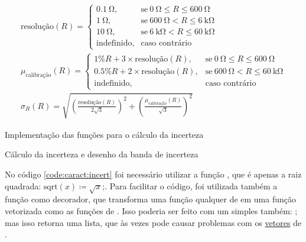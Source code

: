     \begin{gather}
        \label{eq:resolucao}
        \text{resolução}(R) = \begin{cases}
            \SI{0.1}{\ohm}, & \text{se}~ \SI{0}{\ohm} \le R \le \SI{600}{\ohm} \\
            \SI{1}{\ohm},   & \text{se}~ \SI{600}{\ohm} < R \le \SI{6}{\kilo\ohm} \\
            \SI{10}{\ohm},  & \text{se}~ \SI{6}{\kilo\ohm} < R \le \SI{60}{\kilo\ohm} \\
            \text{indefinido}, & \text{caso contrário}
        \end{cases} \\%
        \label{eq:calibracao}
        \mu_\text{calibração}(R) = \begin{cases}
            1\% R + 3 \times \text{resolução}(R),   & \text{se}~ \SI{0}{\ohm} \le R \le \SI{600}{\ohm} \\
            0.5\% R + 2 \times \text{resolução}(R), & \text{se}~ \SI{600}{\ohm} < R \le \SI{60}{\kilo\ohm} \\
            \text{indefinido}, & \text{caso contrário}
        \end{cases} \\%
        \label{eq:incerteza}
        \sigma_R(R) = \sqrt{\left(\frac{\text{resolução}(R)}{2 \sqrt{3}} \right)^2 + \left(\frac{\mu_\text{calibração}(R)}{\sqrt{3}} \right)^2}
    \end{gather}

    \begin{listing}[H]
        \caption{Implementação das funções para o cálculo da incerteza}
        \label{code:caract:incert}

    \end{listing}

    \begin{listing}[H]
        \caption{Cálculo da incerteza e desenho da banda de incerteza}
        \label{code:caract:bandas}

    \end{listing}

    No código \ref{code:caract:incert} foi necessário utilizar a função , que é apenas a raiz quadrada: $\text{sqrt}(x) \coloneqq \sqrt{x}$;. Para facilitar o código, foi utilizada também a função  como decorador, que transforma uma função qualquer de \python em uma função vetorizada como as funções de \numpy. Isso poderia ser feito com um simples  também: ; mas isso retorna uma lista, que às vezes pode causar problemas com os \href{https://docs.scipy.org/doc/numpy/reference/arrays.html}{vetores} de \numpy.

